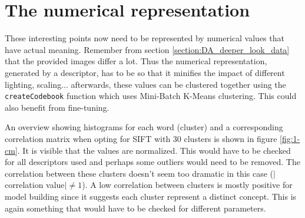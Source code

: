 
\section*{The numerical representation}

These interesting points now need to be represented by numerical values that have actual meaning.
Remember from section \ref{section:DA_deeper_look_data} that the provided images differ a lot.
Thus the numerical representation, generated by a descriptor, has to be so that it minifies the impact of different lighting, scaling...
afterwards, these values can be clustered together using the \texttt{createCodebook} function which uses Mini-Batch K-Means clustering.
This could also benefit from fine-tuning.

An overview showing histograms for each word (cluster) and a corresponding correlation matrix when opting for SIFT with 30 clusters is shown in figure \ref{fig:1-cm}.
It is visible that the values are normalized.
This would have to be checked for all descriptors used and perhaps some outliers would need to be removed.
The correlation between these clusters doesn't seem too dramatic in this case ($|$correlation value$| \neq 1 $).
A low correlation between clusters is mostly positive for model building since it suggests each cluster represent a distinct concept.
This is again something that would have to be checked for different parameters.

